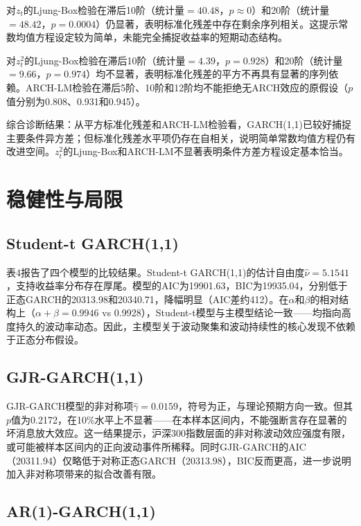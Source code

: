 \documentclass[11pt,a4paper]{article}
\begin{document}
对\(z_t\)的Ljung-Box检验在滞后10阶（统计量$=40.48$，\(p\approx 0\)）和20阶（统计量$=48.42$，\(p=0.0004\)）仍显著，表明标准化残差中存在剩余序列相关。这提示常数均值方程设定较为简单，未能完全捕捉收益率的短期动态结构。

对\(z_t^2\)的Ljung-Box检验在滞后10阶（统计量$=4.39$，\(p=0.928\)）和20阶（统计量$=9.66$，\(p=0.974\)）均不显著，表明标准化残差的平方不再具有显著的序列依赖。ARCH-LM检验在滞后5阶、10阶和12阶均不能拒绝无ARCH效应的原假设（\(p\)值分别为0.808、0.931和0.945）。

综合诊断结果：从平方标准化残差和ARCH-LM检验看，GARCH(1,1)已较好捕捉主要条件异方差；但标准化残差水平项仍存在自相关，说明简单常数均值方程仍有改进空间。\(z_t^2\)的Ljung-Box和ARCH-LM不显著表明条件方差方程设定基本恰当。

\section{稳健性与局限}

\subsection{Student-t GARCH(1,1)}

表4报告了四个模型的比较结果。Student-t GARCH(1,1)的估计自由度\(\hat{\nu}=5.1541\)，支持收益率分布存在厚尾。模型的AIC为19901.63，BIC为19935.04，分别低于正态GARCH的20313.98和20340.71，降幅明显（AIC差约412）。在\(\alpha\)和\(\beta\)的相对结构上（\(\alpha+\beta=0.9946\) vs 0.9928），Student-t模型与主模型结论一致——均指向高度持久的波动率动态。因此，主模型关于波动聚集和波动持续性的核心发现不依赖于正态分布假设。

\subsection{GJR-GARCH(1,1)}

GJR-GARCH模型的非对称项\(\hat{\gamma}=0.0159\)，符号为正，与理论预期方向一致。但其\(p\)值为0.2172，在10\%水平上不显著——在本样本区间内，不能强断言存在显著的坏消息放大效应。这一结果提示，沪深300指数层面的非对称波动效应强度有限，或可能被样本区间内的正向波动事件所稀释。同时GJR-GARCH的AIC（20311.94）仅略低于对称正态GARCH（20313.98），BIC反而更高，进一步说明加入非对称项带来的拟合改善有限。

\subsection{AR(1)-GARCH(1,1)}
\end{document}
